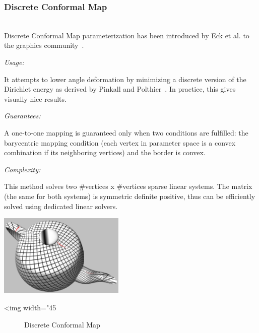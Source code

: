 \subsubsection{Discrete Conformal Map}

  \\

Discrete Conformal Map parameterization has been introduced by Eck et
al. to the graphics community~\cite{cgal:eddhls-maam-95}.

\emph{Usage:}

It attempts to
lower angle deformation by minimizing a discrete version of the
Dirichlet energy as derived by Pinkall and
Polthier~\cite{cgal:pp-cdmsc-93}.
In practice, this gives visually nice results.

\emph{Guarantees:}

A one-to-one mapping is guaranteed only when two conditions are
fulfilled: the barycentric mapping condition (each vertex in parameter
space is a convex combination if its neighboring vertices) and the
border is convex.


\emph{Complexity:}

This method solves two \#vertices x \#vertices sparse linear
systems. The matrix (the same for both systems) is symmetric definite
positive, thus can be efficiently solved using dedicated linear
solvers.

\begin{center}
    \label{Surface_mesh_parameterization-fig-conformal}
    \begin{ccTexOnly}
        \includegraphics[width=0.45\textwidth]{Surface_mesh_parameterization/conformal}
    \end{ccTexOnly}
    \begin{ccHtmlOnly}
        <img width="45%
    \end{ccHtmlOnly}
    \begin{figure}[h]
        \caption{Discrete Conformal Map}
    \end{figure}
\end{center}

